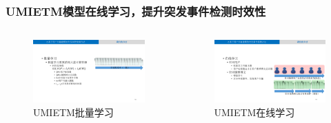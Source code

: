 \begin{frame}
\frametitle{\noindent UMIETM模型在线学习，提升突发事件检测时效性}
\vspace{-6mm}
\begin{columns}
\begin{column}{0.48\paperwidth}
	\begin{figure}
		\setlength{\abovecaptionskip}{0.cm}
		\setlength{\belowcaptionskip}{0.cm}
		\caption{UMIETM批量学习}
		\includegraphics[width=\textwidth]{img/UMIETM/batch_learning.pdf}
	\end{figure}
\end{column}

\begin{column}{0.48\paperwidth}
	\begin{figure}
		\setlength{\abovecaptionskip}{0.cm}
		\setlength{\belowcaptionskip}{0.cm}
		\caption{UMIETM在线学习}
		\includegraphics[width=\textwidth]{img/UMIETM/online_learning.pdf}
	\end{figure}
\end{column}	
\end{columns}


\end{frame}
